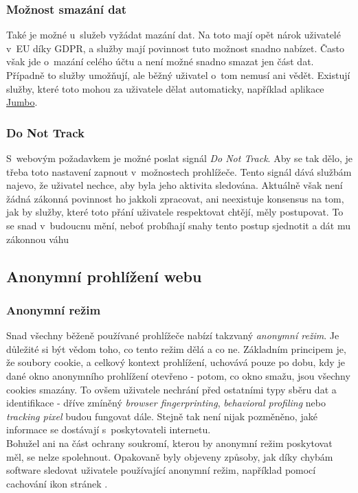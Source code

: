 \subsubsection*{Možnost smazání dat}
Také je možné u~služeb vyžádat mazání dat. Na toto mají opět nárok uživatelé v~EU díky GDPR, a služby mají povinnost tuto možnost snadno nabízet. Často však jde o~mazání celého účtu a není možné snadno smazat jen část dat. Případně to služby umožňují, ale běžný uživatel o~tom nemusí ani vědět. Existují služby, které toto mohou za uživatele dělat automaticky, například aplikace \href{https://www.jumboprivacy.com}{Jumbo}. 

\subsubsection*{Do Not Track}
S~webovým požadavkem je možné poslat signál \textit{Do Not Track}. Aby se tak dělo, je třeba toto nastavení zapnout v~možnostech prohlížeče. Tento signál dává službám najevo, že uživatel nechce, aby byla jeho aktivita sledována. Aktuálně však není žádná zákonná povinnost ho jakkoli zpracovat, ani neexistuje konsensus na tom, jak by služby, které toto přání uživatele respektovat chtějí, měly postupovat. To se snad v~budoucnu mění, neboť probíhají snahy tento postup sjednotit a dát mu zákonnou váhu \citep{do-not-track-future}

\subsection{Anonymní prohlížení webu}

\subsubsection*{Anonymní režim}
Snad všechny běženě používané prohlížeče nabízí takzvaný \textit{anonymní režim}. Je důležité si být vědom toho, co tento režim dělá a co ne.
Základním principem je, že soubory cookie, a celkový kontext prohlížení, uchovává pouze po dobu, kdy je dané okno anonymního prohlížení otevřeno - potom, co okno smažu, jsou všechny cookies smazány. To ovšem uživatele nechrání před ostatními typy sběru dat a identifikace - dříve zmíněný \textit{browser fingerprinting}, \textit{behavioral profiling} nebo \textit{tracking pixel} budou fungovat dále. Stejně tak není nijak pozměněno, jaké informace se dostávají s~poskytovateli internetu.\\
Bohužel ani na část ochrany soukromí, kterou by anonymní režim poskytovat měl, se nelze spolehnout. Opakovaně byly objeveny způsoby, jak díky chybám software sledovat uživatele používající anonymní režim, například pomocí cachování ikon stránek \citep{incognito-tracking}.

